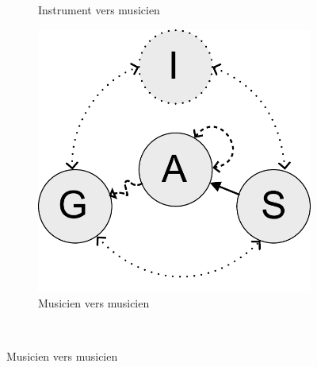\begin{figure}[!htbp]
{\begin{subfigure}[b]{.33\textwidth}
			\caption{Instrument vers musicien}
		\end{subfigure}%
		\hspace{.02\linewidth}
		\begin{subfigure}[b]{.33\textwidth}
			\centering
			\includegraphics[width=0.9\linewidth]{gfx/03_gesture/gesture-inference-a.pdf}
			\caption{Musicien vers musicien}
		\end{subfigure}%
	}\\
\end{figure}
